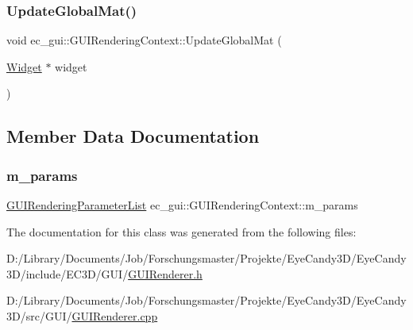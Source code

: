 \mbox{\label{classec__gui_1_1_g_u_i_rendering_context_a508e81b956037b50522eeb930ab3cd60}} 
\subsubsection{\texorpdfstring{Update\+Global\+Mat()}{UpdateGlobalMat()}}
{\footnotesize\ttfamily void ec\+\_\+gui\+::\+G\+U\+I\+Rendering\+Context\+::\+Update\+Global\+Mat (\begin{DoxyParamCaption}\item[{\mbox{\hyperlink{classec__gui_1_1_widget}{Widget}} $\ast$}]{widget }\end{DoxyParamCaption})}



\subsection{Member Data Documentation}
\mbox{\label{classec__gui_1_1_g_u_i_rendering_context_a04be470f42b7b4a3fa333ea15ea23a86}} 
\subsubsection{\texorpdfstring{m\+\_\+params}{m\_params}}
{\footnotesize\ttfamily \mbox{\hyperlink{structec__gui_1_1_g_u_i_rendering_parameter_list}{G\+U\+I\+Rendering\+Parameter\+List}} ec\+\_\+gui\+::\+G\+U\+I\+Rendering\+Context\+::m\+\_\+params}



The documentation for this class was generated from the following files\+:\begin{DoxyCompactItemize}
\item 
D\+:/\+Library/\+Documents/\+Job/\+Forschungsmaster/\+Projekte/\+Eye\+Candy3\+D/\+Eye\+Candy3\+D/include/\+E\+C3\+D/\+G\+U\+I/\mbox{\hyperlink{_g_u_i_renderer_8h}{G\+U\+I\+Renderer.\+h}}\item 
D\+:/\+Library/\+Documents/\+Job/\+Forschungsmaster/\+Projekte/\+Eye\+Candy3\+D/\+Eye\+Candy3\+D/src/\+G\+U\+I/\mbox{\hyperlink{_g_u_i_renderer_8cpp}{G\+U\+I\+Renderer.\+cpp}}\end{DoxyCompactItemize}
